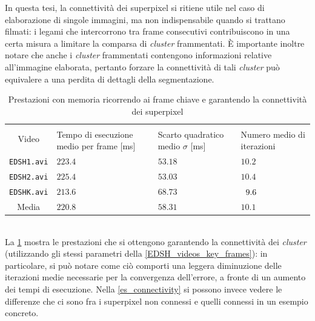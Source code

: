 \documentclass[12pt,a4paper,oneside]{article}
\begin{document}
\noindent In questa tesi, la connettività dei superpixel si ritiene utile nel caso di elaborazione di singole immagini, ma non indispensabile quando si trattano filmati: i legami che intercorrono tra frame consecutivi contribuiscono in una certa misura a limitare la comparsa di \textit{cluster} frammentati. È importante inoltre notare che anche i \textit{cluster} frammentati contengono informazioni relative all'immagine elaborata, pertanto forzare la connettività di tali \textit{cluster} può equivalere a una perdita di dettagli della segmentazione.
\begin{table}[!htb]
	\renewcommand{\arraystretch}{1.26}
	\centering
	\begin{tabular}{|c||>{\centering\arraybackslash}m{}|>{\centering\arraybackslash}m{}|>{\centering\arraybackslash}m{}|}
	    \hline
		\multirow{2}{*}{\vspace{-6ex}Video}
		& \multicolumn{3}{c|}{VideoSLIC}\\\cline{2-4}
		& Tempo di esecuzione medio per frame [ms] & Scarto quadratico medio $\sigma$ [ms] & Numero medio di iterazioni\\
		\hline\hline
		\texttt{EDSH1.avi} & $223.4$ & $53.18$ & $            10.2$ \\\hline
		\texttt{EDSH2.avi} & $225.4$ & $53.03$ & $            10.4$ \\\hline
		\texttt{EDSHK.avi} & $213.6$ & $68.73$ & $\hspace{.5em}9.6$ \\\hline\hline
		Media              & $220.8$ & $58.31$ & $            10.1$ \\\hline
	\end{tabular}
	\captionsetup{justification=centering}
	\caption{Prestazioni con memoria ricorrendo ai frame chiave e garantendo la connettività dei superpixel}
	\label{EDSH_videos_key_frames_connectivity}
\end{table}
\\La \cref{EDSH_videos_key_frames_connectivity} mostra le prestazioni che si ottengono garantendo la connettività dei \textit{cluster} (utilizzando gli stessi parametri della \cref{EDSH_videos_key_frames}): in particolare, si può notare come ciò comporti una leggera diminuzione delle iterazioni medie necessarie per la convergenza dell'errore, a fronte di un aumento dei tempi di esecuzione. Nella \cref{es_connectivity} si possono invece vedere le differenze che ci sono fra i superpixel non connessi e quelli connessi in un esempio concreto. 
\end{document}
